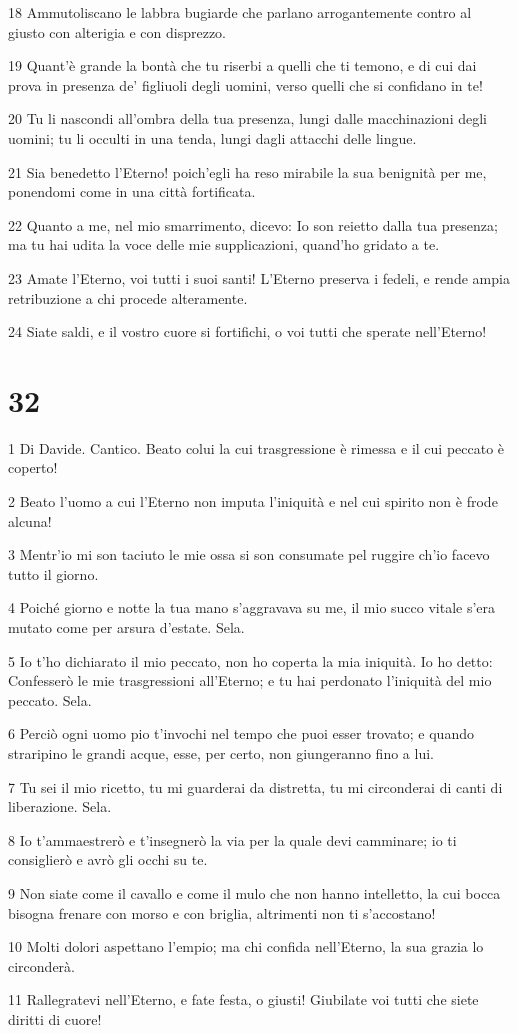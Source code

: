 \par 18 Ammutoliscano le labbra bugiarde che parlano arrogantemente contro al giusto con alterigia e con disprezzo.
\par 19 Quant'è grande la bontà che tu riserbi a quelli che ti temono, e di cui dai prova in presenza de' figliuoli degli uomini, verso quelli che si confidano in te!
\par 20 Tu li nascondi all'ombra della tua presenza, lungi dalle macchinazioni degli uomini; tu li occulti in una tenda, lungi dagli attacchi delle lingue.
\par 21 Sia benedetto l'Eterno! poich'egli ha reso mirabile la sua benignità per me, ponendomi come in una città fortificata.
\par 22 Quanto a me, nel mio smarrimento, dicevo: Io son reietto dalla tua presenza; ma tu hai udita la voce delle mie supplicazioni, quand'ho gridato a te.
\par 23 Amate l'Eterno, voi tutti i suoi santi! L'Eterno preserva i fedeli, e rende ampia retribuzione a chi procede alteramente.
\par 24 Siate saldi, e il vostro cuore si fortifichi, o voi tutti che sperate nell'Eterno!

\chapter{32}

\par 1 Di Davide. Cantico. Beato colui la cui trasgressione è rimessa e il cui peccato è coperto!
\par 2 Beato l'uomo a cui l'Eterno non imputa l'iniquità e nel cui spirito non è frode alcuna!
\par 3 Mentr'io mi son taciuto le mie ossa si son consumate pel ruggire ch'io facevo tutto il giorno.
\par 4 Poiché giorno e notte la tua mano s'aggravava su me, il mio succo vitale s'era mutato come per arsura d'estate. Sela.
\par 5 Io t'ho dichiarato il mio peccato, non ho coperta la mia iniquità. Io ho detto: Confesserò le mie trasgressioni all'Eterno; e tu hai perdonato l'iniquità del mio peccato. Sela.
\par 6 Perciò ogni uomo pio t'invochi nel tempo che puoi esser trovato; e quando straripino le grandi acque, esse, per certo, non giungeranno fino a lui.
\par 7 Tu sei il mio ricetto, tu mi guarderai da distretta, tu mi circonderai di canti di liberazione. Sela.
\par 8 Io t'ammaestrerò e t'insegnerò la via per la quale devi camminare; io ti consiglierò e avrò gli occhi su te.
\par 9 Non siate come il cavallo e come il mulo che non hanno intelletto, la cui bocca bisogna frenare con morso e con briglia, altrimenti non ti s'accostano!
\par 10 Molti dolori aspettano l'empio; ma chi confida nell'Eterno, la sua grazia lo circonderà.
\par 11 Rallegratevi nell'Eterno, e fate festa, o giusti! Giubilate voi tutti che siete diritti di cuore!

